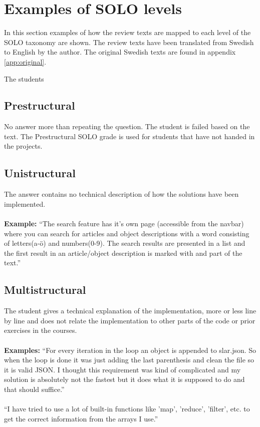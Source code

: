 \documentclass[twoside,twocolumn,a4paper,11pt,english]{article}
\begin{document}
\section{Examples of SOLO levels} \label{sec:examples}

In this section examples of how the review texts are mapped to each level of the SOLO taxonomy are shown. The review texts have been translated from Swedish to English by the author. The original Swedish texts are found in appendix \ref{app:original}.

The students

\subsection{Prestructural}

No answer more than repeating the question. The student is failed based on the text. The Prestructural SOLO grade is used for students that have not handed in the projects.

\subsection{Unistructural}

The answer contains no technical description of how the solutions have been implemented.
\\
\\
\textbf{Example:} ``The search feature has it's own page (accessible from the navbar) where you can search for articles and object descriptions with a word consisting of letters(a-ö) and numbers(0-9). The search results are presented in a list and the first result in an article/object description is marked with and part of the text.''

\subsection{Multistructural}

The student gives a technical explanation of the implementation, more or less line by line and does not relate the implementation to other parts of the code or prior exercises in the courses.
\\
\\
\textbf{Examples:} ``For every iteration in the loop an object is appended to slar.json. So when the loop is done it was just adding the last parenthesis and clean the file so it is valid JSON. I thought this requirement was kind of complicated and my solution is absolutely not the fastest but it does what it is supposed to do and that should suffice.''
\\
\\
``I have tried to use a lot of built-in functions like 'map', 'reduce', 'filter', etc. to get the correct information from the arrays I use.''
\end{document}
